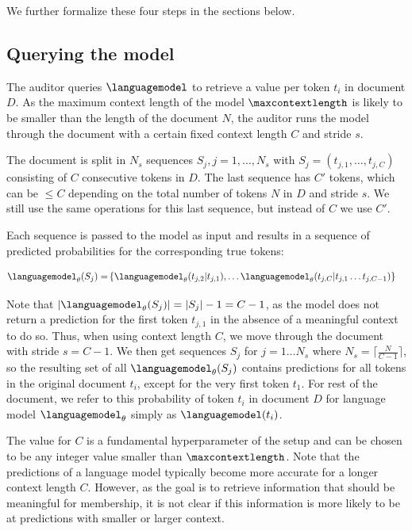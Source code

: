 \documentclass[twocolumn,10pt]{article}
\begin{document}
We further formalize these four steps in the sections below. 

\subsection{Querying the model}
\label{sec:query_model}

The auditor queries $\languagemodel$ to retrieve a value per token $t_i$ in document $D$. As the maximum context length of the model $\maxcontextlength$ is likely to be smaller than the length of the document $N$, the auditor runs the model through the document with a certain fixed context length $C$ and stride $s$. 

The document is split in $N_s$ sequences $S_j, j = 1,...,N_s$ with $S_j = (t_{j,1}, \ldots, t_{j,C})$ consisting of $C$ consecutive tokens in $D$. The last sequence has $C'$ tokens, which can be $\leq C$ depending on the total number of tokens $N$ in $D$ and stride $s$. We still use the same operations for this last sequence, but instead of $C$ we use $C'$. 

Each sequence is passed to the model as input and results in a sequence of predicted probabilities for the corresponding true tokens:

\begin{align}
\begin{split}
\languagemodel_{\theta}(S_j) = & \left\{\languagemodel_{\theta}(t_{j,2} | t_{j,1}),\ldots \languagemodel_{\theta}(t_{j,C} | t_{j,1} \ldots t_{j,C-1}) \right\}
\end{split}
\end{align}

Note that $|\languagemodel_{\theta}(S_j)| = |S_j| - 1 = C -1$, as the model does not return a prediction for the first token $t_{j,1}$ in the absence of a meaningful context to do so. Thus, when using context length $C$, we move through the document with stride $s = C-1$. We then get sequences $S_j$ for $j = 1 \ldots{N_s}$ where $N_s = \lceil\frac{N}{C-1}\rceil$, so the resulting set of all $\languagemodel_{\theta}(S_j)$ contains predictions for all tokens in the original document $t_i$, except for the very first token $t_1$. For rest of the document, we refer to this probability of token $t_i$ in document $D$ for language model $\languagemodel_{\theta}$ simply as $\languagemodel(t_i)$.

The value for $C$ is a fundamental hyperparameter of the setup and can be chosen to be any integer value smaller than $\maxcontextlength$. Note that the predictions of a language model typically become more accurate for a longer context length $C$. However, as the goal is to retrieve information that should be meaningful for membership, it is not clear if this information is more likely to be at predictions with smaller or larger context.
\end{document}
